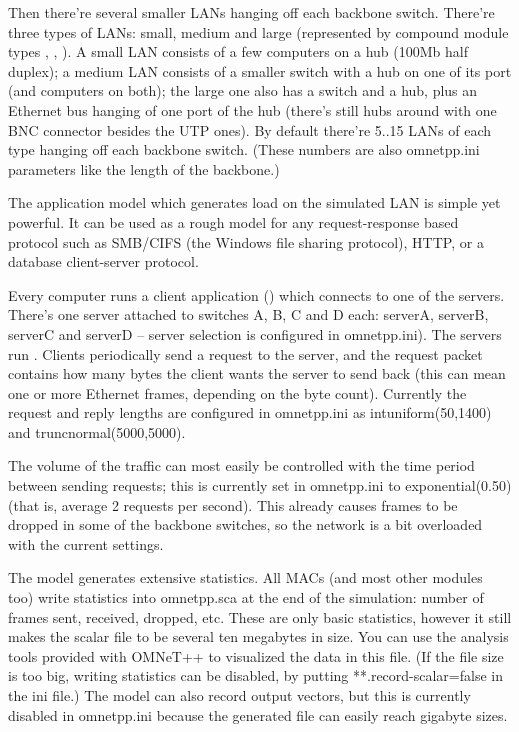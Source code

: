 Then there're several smaller LANs hanging off each backbone switch.
There're three types of LANs: small, medium and large (represented by
compound module types , , ). A small LAN
consists of a few computers on a hub (100Mb half duplex); a medium
LAN consists of a smaller switch with a hub on one of its port
(and computers on both); the large one also has a switch and a hub,
plus an Ethernet bus hanging of one port of the hub (there's still hubs
around with one BNC connector besides the UTP ones).
By default there're 5..15 LANs of each type hanging off each backbone
switch. (These numbers are also omnetpp.ini parameters like the length
of the backbone.)

The application model which generates load on the simulated LAN is
simple yet powerful. It can be used as a rough model for any
request-response based protocol such as SMB/CIFS (the Windows file
sharing protocol), HTTP, or a database client-server protocol.

Every computer runs a client application () which connects
to one of the servers. There's one server attached to switches A, B,
C and D each: serverA, serverB, serverC and serverD -- server selection
is configured in omnetpp.ini). The servers run .
Clients periodically send a request to the server, and the request
packet contains how many bytes the client wants the server to send back
(this can mean one or more Ethernet frames, depending on the byte count).
 Currently the request and reply lengths are configured in omnetpp.ini
as intuniform(50,1400) and truncnormal(5000,5000).

The volume of the traffic can most easily be controlled with the
time period between sending requests; this is currently
set in omnetpp.ini to exponential(0.50) (that is, average 2
requests per second). This already causes frames to be dropped
in some of the backbone switches, so the network is a bit
overloaded with the current settings.

The model generates extensive statistics. All MACs (and most other
modules too) write statistics into omnetpp.sca at the end
of the simulation: number of frames sent, received, dropped, etc.
These are only basic statistics, however it still makes the
scalar file to be several ten megabytes in size. You can use
the analysis tools provided with OMNeT++ to visualized the data
in this file. (If the file size is too big, writing statistics
can be disabled, by putting **.record-scalar=false in the ini file.)
The model can also record output vectors, but this is currently
disabled in omnetpp.ini because the generated file can easily reach
gigabyte sizes.





